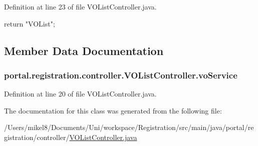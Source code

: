 Definition at line 23 of file VOListController.java.


\begin{DoxyCode}
                                                                {
                return "VOList";
        }
\end{DoxyCode}


\subsection{Member Data Documentation}
\hypertarget{classportal_1_1registration_1_1controller_1_1VOListController_a8bae931aec8ab793ebbd739ce4211171}{
\subsubsection[{voService}]{ {\bf portal.registration.controller.VOListController.voService}}}
\label{classportal_1_1registration_1_1controller_1_1VOListController_a8bae931aec8ab793ebbd739ce4211171}


Definition at line 20 of file VOListController.java.



The documentation for this class was generated from the following file:\begin{DoxyCompactItemize}
\item 
/Users/mikel8/Documents/Uni/workspace/Registration/src/main/java/portal/registration/controller/\hyperlink{VOListController_8java}{VOListController.java}\end{DoxyCompactItemize}
